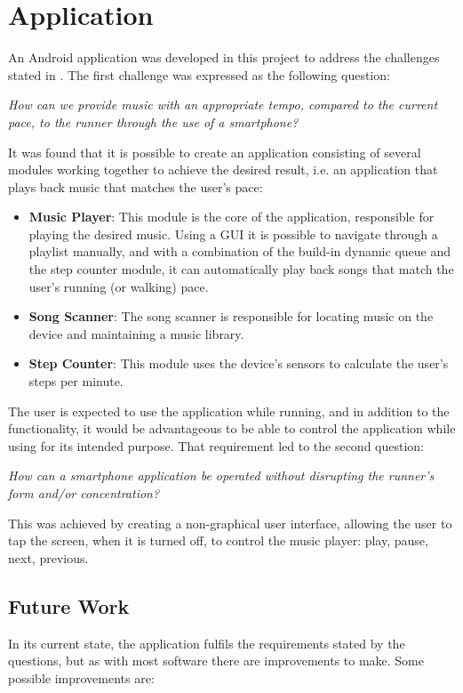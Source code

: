 \section{Application}
An Android application was developed in this project to address the challenges stated in . The first challenge was expressed as the following question:

\begin{center}
\textit{How can we provide music with an appropriate tempo, compared to the current pace, to the runner through the use of a smartphone?}
\end{center}

It was found that it is possible to create an application consisting of several modules working together to achieve the desired result, i.e. an application that plays back music that matches the user's pace:

\begin{itemize}
\item \textbf{Music Player}: This module is the core of the application, responsible for playing the desired music. Using a GUI it is possible to navigate through a playlist manually, and with a combination of the build-in dynamic queue and the step counter module, it can automatically play back songs that match the user's running (or walking) pace.
\item \textbf{Song Scanner}: The song scanner is responsible for locating music on the device and maintaining a music library.
\item \textbf{Step Counter}: This module uses the device's sensors to calculate the user's steps per minute.
\end{itemize}

The user is expected to use the application while running, and in addition to the functionality, it would be advantageous to be able to control the application while using for its intended purpose. That requirement led to the second question:

\begin{center}
\textit{How can a smartphone application be operated without disrupting the runner's form and/or concentration?}
\end{center}

This was achieved by creating a non-graphical user interface, allowing the user to tap the screen, when it is turned off, to control the music player: play, pause, next, previous.


\subsection{Future Work}
In its current state, the application fulfils the requirements stated by the questions, but as with most software there are improvements to make. Some possible improvements are:

